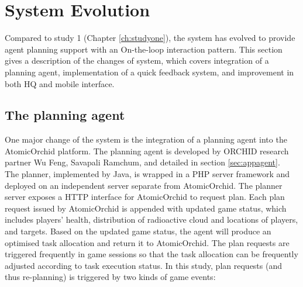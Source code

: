 \section{System Evolution}\label{sec:studytwosystem}
Compared to study 1 (Chapter \ref{ch:studyone}), the system has evolved to provide agent planning support with an On-the-loop interaction pattern. This section gives a description of the changes of system, which covers integration of a planning agent, implementation of a quick feedback system, and improvement in both HQ and mobile interface.

\subsection{The planning agent}\label{sec:studyoneagent}
One major change of the system is the integration of a planning agent into the AtomicOrchid platform. The planning agent is developed by ORCHID research partner Wu Feng, Savapali Ramchum, and detailed in section \ref{sec:appagent}. \\


The planner, implemented by Java, is wrapped in a PHP server framework and deployed on an independent server separate from AtomicOrchid. The planner server exposes a HTTP interface for AtomicOrchid to request plan. Each plan request issued by AtomicOrchid is appended with updated game status, which includes players' health, distribution of radioactive cloud and locations of players, and targets. Based on the updated game status, the agent will produce an optimised task allocation and return it to AtomicOrchid. The plan requests are triggered frequently in game sessions so that the task allocation can be frequently adjusted according to task execution status. In this study, plan requests (and thus re-planning) is triggered by two kinds of game events:\\


